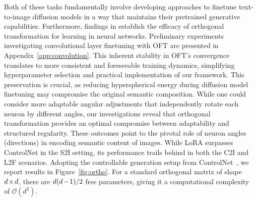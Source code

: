 {Both of these tasks fundamentally involve developing approaches to finetune text-to-image diffusion models in a way that maintains their pretrained generative capabilities. Furthermore, findings in \cite{liu2021orthogonal} establish the efficacy of orthogonal transformation for learning in neural networks. Preliminary experiments investigating convolutional layer finetuning with OFT are presented in Appendix~\ref{app:convolution}. This inherent stability in OFT’s convergence translates to more consistent and foreseeable training dynamics, simplifying hyperparameter selection and practical implementation of our framework. This preservation is crucial, as reducing hyperspherical energy during diffusion model finetuning may compromise the original semantic composition. While one could consider more adaptable angular adjustments that independently rotate each neuron by different angles, our investigations reveal that orthogonal transformation provides an optimal compromise between adaptability and structured regularity. These outcomes point to the pivotal role of neuron angles (directions) in encoding semantic content of images. While LoRA surpasses ControlNet in the S2I setting, its performance trails behind in both the C2I and L2F scenarios. Adopting the controllable generation setup from ControlNet~\cite{zhang2023adding}, we report results in Figure~\ref{fig:ortho}. For a standard orthogonal matrix of shape $\thickmuskip=2mu \medmuskip=2mu d\times d$, there are $\thickmuskip=2mu \medmuskip=2mu d(d-1)/2$ free parameters, giving it a computational complexity of $\mathcal{O}(d^2)$. 
\begin{abstract}

\end{abstract}}
